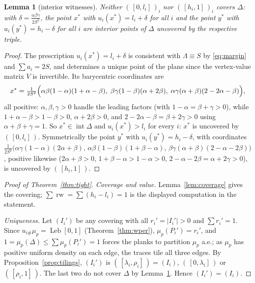 \documentclass[11pt,reqno]{amsart}
\theoremstyle{plain}
\newtheorem{lemma}[theorem]{Lemma}
\theoremstyle{definition}
\theoremstyle{remark}
\newcommand{\rw}{\operatorname{rw}}
\newcommand{\Leb}{\operatorname{Leb}}
\begin{document}
\begin{lemma}[interior witnesses]\label{lem:witness}
Neither $(\,[0,l_i]\,)_i$ nor $(\,[h_i,1]\,)_i$ covers $\Delta$: with
$\delta=\frac{\alpha\beta\gamma}{2S^2}$, the point $x^\ast$ with
$u_i(x^\ast)=l_i+\delta$ for all $i$ and the point $y^\ast$ with
$u_i(y^\ast)=h_i-\delta$ for all $i$ are interior points of $\Delta$ uncovered
by the respective triple.
\end{lemma}

\begin{proof}
The prescription $u_i(x^\ast)=l_i+\delta$ is consistent with
$\Lambda\equiv S$ by \eqref{eq:margin} and $\sum a_i=2S$, and determines a
unique point of the plane since the vertex-value matrix $V$ is invertible. Its
barycentric coordinates are
\[
x^\ast=\tfrac1{2S^2}\Bigl(\alpha\beta(1-\alpha)(1+\alpha-\beta),\;
\beta\gamma(1-\beta)(\alpha+2\beta),\;
\alpha\gamma(\alpha+\beta)(2-2\alpha-\beta)\Bigr),
\]
all positive: $\alpha,\beta,\gamma>0$ handle the leading factors (with
$1-\alpha=\beta+\gamma>0$), while $1+\alpha-\beta>1-\beta>0$, $\alpha+2\beta>0$,
and $2-2\alpha-\beta=\beta+2\gamma>0$ using $\alpha+\beta+\gamma=1$. So
$x^\ast\in\operatorname{int}\Delta$ and
$u_i(x^\ast)>l_i$ for every $i$: $x^\ast$ is uncovered by
$(\,[0,l_i]\,)$. Symmetrically the point $y^\ast$ with
$u_i(y^\ast)=h_i-\delta$, with coordinates
$\frac1{2S^2}\bigl(\alpha\gamma(1-\alpha)(2\alpha+\beta),\,
\alpha\beta(1-\beta)(1+\beta-\alpha),\,
\beta\gamma(\alpha+\beta)(2-\alpha-2\beta)\bigr)$, positive likewise
($2\alpha+\beta>0$, $1+\beta-\alpha>1-\alpha>0$,
$2-\alpha-2\beta=\alpha+2\gamma>0$), is uncovered by
$(\,[h_i,1]\,)$.
\end{proof}

\begin{proof}[Proof of Theorem~\ref{thm:tight}]
\emph{Coverage and value.} Lemma~\ref{lem:coverage} gives the covering;
$\sum\rw=\sum(h_i-l_i)=1$ is the displayed computation in the statement.

\emph{Uniqueness.} Let $(I_i')$ be any covering with all
$r_i'=|I_i'|>0$ and $\sum r_i'=1$. Since $u_{i\#}\mu_p=\Leb[0,1]$
(Theorem~\ref{thm:wper}), $\mu_p(P_i')=r_i'$, and
$1=\mu_p(\Delta)\le\sum\mu_p(P_i')=1$ forces the planks to partition $\mu_p$
a.e.; as $\mu_p$ has positive uniform density on each edge, the traces tile all
three edges. By Proposition~\ref{prop:tilings}, $(I_i')$ is $(\,[\lambda_i,
\rho_i]\,)=(I_i)$, $(\,[0,\lambda_i]\,)$ or $(\,[\rho_i,1]\,)$. The last two do
not cover $\Delta$ by Lemma~\ref{lem:witness}. Hence $(I_i')=(I_i)$.
\end{proof}
\end{document}
